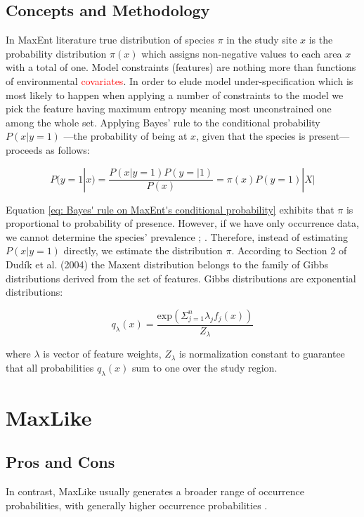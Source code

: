 \documentclass{article}
\begin{document}
\subsection*{Concepts and Methodology}
In MaxEnt literature true distribution of species $\pi$ in the study site $x$ is the probability distribution $\pi (x)$ which assigns non-negative values to each area $x$ with a total of one. Model constraints (features) are nothing more than functions of environmental \textcolor{red}{covariates}. In order to elude model under-specification which is most likely to happen when applying a number of constraints to the model we pick the feature having maximum entropy meaning most unconstrained one among the whole set. Applying Bayes’ rule to the conditional probability $P(x|y=1)$ ---the probability of being at $x$, given that the species is present--- proceeds as follows: 

\begin{equation} \label{eq: Bayes' rule on MaxEnt's conditional probability}
P ( y = 1 |  x )= \frac {P ( x | y = 1 )  P ( y = | 1 ) }{  P (  x )} =  \pi ( x ) P ( y = 1 ) | X |
\end{equation}

Equation \ref{eq: Bayes' rule on MaxEnt's conditional probability} exhibits that $\pi$ is proportional to probability of presence. However, if we have only occurrence data, we cannot determine the species’ prevalence \cite{Phillips2006}; \cite{Ward2009}. Therefore, instead of estimating $P(x|y=1)$ directly, we estimate the distribution $\pi$. According to Section 2 of Dudík et al. (2004) the Maxent distribution belongs to the family of Gibbs distributions derived from the set of features. Gibbs distributions are exponential distributions:

\begin{equation} \label{eq:Gibbs distribution}
q_\lambda (x) = \frac{ \mathrm{exp} (\Sigma_{j=1}^{n} \lambda_j f_j(x))} {Z_\lambda}
\end{equation}

where $\lambda$ is vector of feature weights, $Z_\lambda$ is normalization constant to guarantee that all probabilities $q_\lambda (x)$ sum to one over the study region.

\section*{MaxLike}


\subsection*{Pros and Cons}
In contrast, MaxLike usually generates a broader range of occurrence probabilities, with generally higher occurrence probabilities \cite{Phillips2006}.
\end{document}

